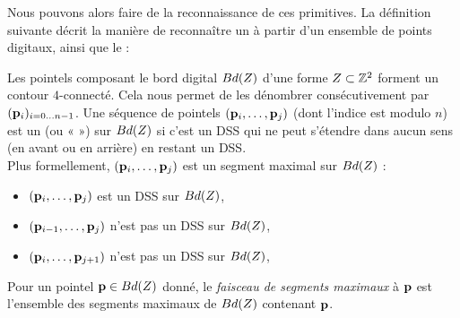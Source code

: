 Nous pouvons alors faire de la reconnaissance de ces primitives. La définition
suivante décrit la manière de reconnaître un  à partir
d'un ensemble de points digitaux, ainsi que le  :
%
\begin{definition}{}
  \label{def:MDSS}
%
  Les pointels composant le bord digital $Bd({Z})$ d'une forme
  $Z \subset \mathbb{Z}^2$ forment un contour $4$-connecté. Cela nous permet de
  les dénombrer consécutivement par $(\mathbf{p}_i)_{i={0\ldots n-1}}$. Une séquence de
  pointels $(\mathbf{p}_i, \ldots, \mathbf{p}_j)$ (dont l'indice est modulo $n$) est un
   (ou «  ») sur $Bd({Z})$ si c'est
  un DSS qui ne peut s'étendre dans aucun sens (en avant ou en arrière) en
  restant un DSS.
  \\
  Plus formellement, $(\mathbf{p}_i, \ldots, \mathbf{p}_j)$ est un segment maximal sur $Bd({Z})$ \ssi :
  \begin{itemize}
    \item $(\mathbf{p}_i, \ldots, \mathbf{p}_j)$ est un DSS sur $Bd({Z})$,
    \item $(\mathbf{p}_{i-1}, \ldots, \mathbf{p}_j)$ n'est pas un DSS sur $Bd({Z})$,
    \item $(\mathbf{p}_i, \ldots, \mathbf{p}_{j+1})$ n'est pas un DSS sur $Bd({Z})$,
  \end{itemize}
  Pour un pointel $\mathbf{p} \in Bd({Z})$ donné, le \emph{faisceau de segments maximaux} à $\mathbf{p}$ est l'ensemble
  des segments maximaux de $Bd({Z})$ contenant $\mathbf{p}$.
%
\end{definition}


